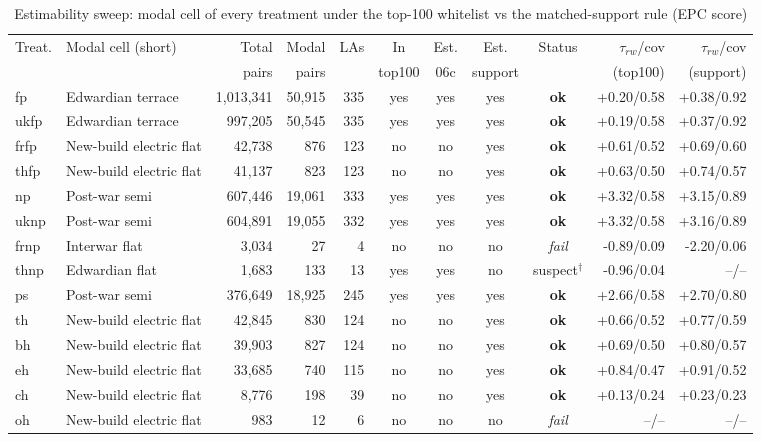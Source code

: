 \begin{landscape}
\begin{table}[htbp]
\centering
\caption{Estimability sweep: modal cell of every treatment under the top-100 whitelist vs the matched-support rule (EPC score)}
\label{tab:hte_pilot_estimability}
\scriptsize
\begin{tabular}{llrrrccccrr}
\toprule
Treat. & Modal cell (short) & Total & Modal & LAs & In & Est. & Est. & Status & $\tau_{rw}$/cov & $\tau_{rw}$/cov \\
 & & pairs & pairs & & top100 & 06c & support & & (top100) & (support) \\
\midrule
fp & Edwardian terrace & 1,013,341 & 50,915 & 335 & yes & yes & yes & \textbf{ok} & +0.20/0.58 & +0.38/0.92 \\
ukfp & Edwardian terrace & 997,205 & 50,545 & 335 & yes & yes & yes & \textbf{ok} & +0.19/0.58 & +0.37/0.92 \\
frfp & New-build electric flat & 42,738 & 876 & 123 & no & no & yes & \textbf{ok} & +0.61/0.52 & +0.69/0.60 \\
thfp & New-build electric flat & 41,137 & 823 & 123 & no & no & yes & \textbf{ok} & +0.63/0.50 & +0.74/0.57 \\
np & Post-war semi & 607,446 & 19,061 & 333 & yes & yes & yes & \textbf{ok} & +3.32/0.58 & +3.15/0.89 \\
uknp & Post-war semi & 604,891 & 19,055 & 332 & yes & yes & yes & \textbf{ok} & +3.32/0.58 & +3.16/0.89 \\
frnp & Interwar flat & 3,034 & 27 & 4 & no & no & no & \textit{fail} & -0.89/0.09 & -2.20/0.06 \\
thnp & Edwardian flat & 1,683 & 133 & 13 & yes & yes & no & suspect$^\dagger$ & -0.96/0.04 & --/-- \\
ps & Post-war semi & 376,649 & 18,925 & 245 & yes & yes & yes & \textbf{ok} & +2.66/0.58 & +2.70/0.80 \\
th & New-build electric flat & 42,845 & 830 & 124 & no & no & yes & \textbf{ok} & +0.66/0.52 & +0.77/0.59 \\
bh & New-build electric flat & 39,903 & 827 & 124 & no & no & yes & \textbf{ok} & +0.69/0.50 & +0.80/0.57 \\
eh & New-build electric flat & 33,685 & 740 & 115 & no & no & yes & \textbf{ok} & +0.84/0.47 & +0.91/0.52 \\
ch & New-build electric flat & 8,776 & 198 & 39 & no & no & yes & \textbf{ok} & +0.13/0.24 & +0.23/0.23 \\
oh & New-build electric flat & 983 & 12 & 6 & no & no & no & \textit{fail} & --/-- & --/-- \\

\end{tabular}
\end{table}
\end{landscape}
